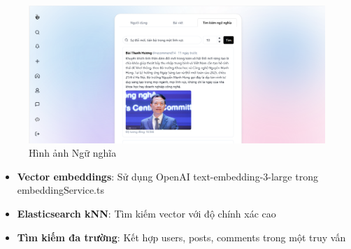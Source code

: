 \begin{figure}[H]
    \centering
    \includegraphics[width=1\textwidth]{image/thucnghiem/ngunghia.png}
    \caption{Hình ảnh Ngữ nghĩa}
    \label{fig:nghu_nghia}
\end{figure}

\begin{itemize}
    \item \textbf{Vector embeddings}: Sử dụng OpenAI text-embedding-3-large trong embeddingService.ts
    \item \textbf{Elasticsearch kNN}: Tìm kiếm vector với độ chính xác cao
    \item \textbf{Tìm kiếm đa trường}: Kết hợp users, posts, comments trong một truy vấn
\end{itemize}

